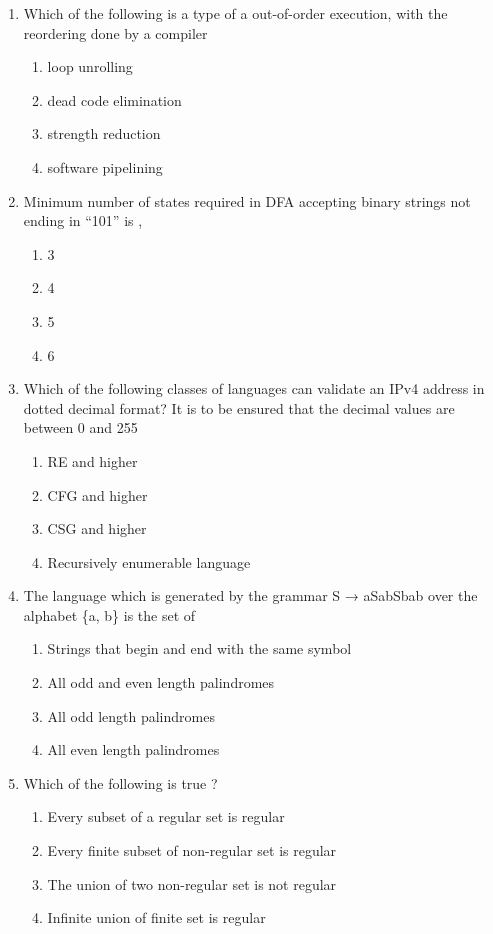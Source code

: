\documentclass[12pt]{article}
\begin{document}
\begin{enumerate}
\item[26.] Which of the following is a type of a out-of-order execution, with the reordering done by a compiler
\begin{enumerate}[label=\Alph*.]
  \item loop unrolling
  \item dead code elimination
  \item strength reduction
  \item software pipelining
\end{enumerate}

\item[27.] Minimum number of states required in DFA accepting binary strings not ending in “101” is ,
\begin{enumerate}[label=\Alph*.]
  \item 3
  \item 4
  \item 5
  \item 6
\end{enumerate}

\item[28.] Which of the following classes of languages can validate an IPv4 address in dotted decimal format? It is to be ensured that the decimal values are between 0 and 255
\begin{enumerate}[label=\Alph*.]
  \item RE and higher
  \item CFG and higher
  \item CSG and higher
  \item Recursively enumerable language
\end{enumerate}

\item[29.] The language which is generated by the grammar S → aSa\textbar{}bSb\textbar{}a\textbar{}b over the alphabet \{a, b\} is the set of
\begin{enumerate}[label=\Alph*.]
  \item Strings that begin and end with the same symbol
  \item All odd and even length palindromes
  \item All odd length palindromes
  \item All even length palindromes
\end{enumerate}

\item[30.] Which of the following is true ?
\begin{enumerate}[label=\Alph*.]
  \item Every subset of a regular set is regular
  \item Every finite subset of non-regular set is regular
  \item The union of two non-regular set is not regular
  \item Infinite union of finite set is regular
\end{enumerate}


\end{enumerate}
\end{document}
